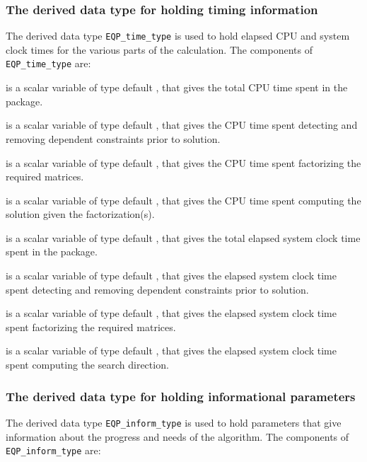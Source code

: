 \documentclass{galahad}
\newcommand{\packagename}{EQP}
\begin{document}
\subsubsection{The derived data type for holding timing 
 information}\label{typetime}
The derived data type 
{\tt \packagename\_time\_type} 
is used to hold elapsed CPU and system clock times for the various parts of 
the calculation. The components of 
{\tt \packagename\_time\_type} 
are:
\begin{description}
 is a scalar variable of type default \realdp, that gives
 the total CPU time spent in the package.

 is a scalar variable of type default \realdp, that gives
 the CPU time spent detecting and removing dependent constraints prior 
to solution.

 is a scalar variable of type default \realdp, that gives
 the CPU time spent factorizing the required matrices.

 is a scalar variable of type default \realdp, that gives
 the CPU time spent computing the solution given the factorization(s).

 is a scalar variable of type default \realdp, that gives
 the total elapsed system clock time spent in the package.

 is a scalar variable of type default \realdp, 
that gives  the elapsed system clock time spent detecting and removing 
dependent constraints prior to solution.

 is a scalar variable of type default \realdp, that gives
 the elapsed system clock time spent factorizing the required matrices.

 is a scalar variable of type default \realdp, that gives
 the elapsed system clock time spent computing the search direction.

\end{description}


\subsubsection{The derived data type for holding informational
 parameters}\label{typeinform}
The derived data type 
{\tt \packagename\_inform\_type} 
is used to hold parameters that give information about the progress and needs 
of the algorithm. The components of 
{\tt \packagename\_inform\_type} 
are:
\end{document}

